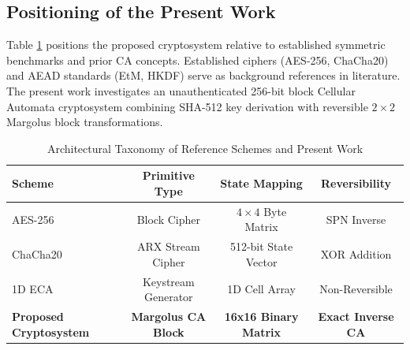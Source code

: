 \subsection{Positioning of the Present Work}
\label{subsec:positioning}
Table \ref{tab:literature_taxonomy} positions the proposed cryptosystem relative to established symmetric benchmarks and prior CA concepts. Established ciphers (AES-256, ChaCha20) and AEAD standards (EtM, HKDF) serve as background references in literature. The present work investigates an unauthenticated 256-bit block Cellular Automata cryptosystem combining SHA-512 key derivation with reversible $2 \times 2$ Margolus block transformations.

\begin{table}[htbp]
\caption{Architectural Taxonomy of Reference Schemes and Present Work}
\label{tab:literature_taxonomy}
\centering
\begin{tabular}{|l|c|c|c|}
\hline
\textbf{Scheme} & \textbf{Primitive Type} & \textbf{State Mapping} & \textbf{Reversibility} \\ \hline
AES-256 \cite{daemen2002design} & Block Cipher & $4 \times 4$ Byte Matrix & SPN Inverse \\ \hline
ChaCha20 \cite{bernstein2008chacha} & ARX Stream Cipher & 512-bit State Vector & XOR Addition \\ \hline
1D ECA \cite{wolfram1986random} & Keystream Generator & 1D Cell Array & Non-Reversible \\ \hline
\textbf{Proposed Cryptosystem} & \textbf{Margolus CA Block} & \textbf{16x16 Binary Matrix} & \textbf{Exact Inverse CA} \\ \hline
\end{tabular}
\end{table}
